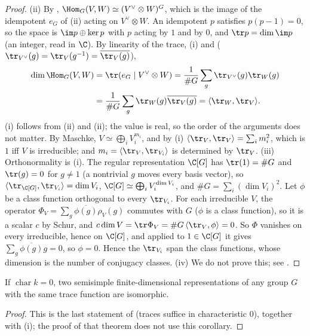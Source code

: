 \begin{proof}
(ii) By , $\Hom_G(V,W)\simeq(V^\vee\otimes W)^G$, which is the image of the idempotent $e_G$ of (ii) acting on
$V^\vee\otimes W$. An idempotent $p$ satisfies $p(p-1)=0$, so the space is $\im p\oplus\ker p$ with $p$ acting by $1$ and by $0$, and $\tr p=\dim\im p$
(an integer, read in $\C$). By linearity of the trace, (i) and 
($\tr_{V^\vee}(g)=\tr_V(g^{-1})=\overline{\tr_V(g)}$),
\begin{align*}
\dim\Hom_G(V,W)&=\tr(e_G\mid V^\vee\otimes W)=\frac1{\#G}\sum_g\tr_{V^\vee}(g)\tr_W(g)\\
&=\frac1{\#G}\sum_g\tr_W(g)\overline{\tr_V(g)}=\langle\tr_W,\tr_V\rangle.
\end{align*}
(i) follows from (ii) and (ii); the value is real, so the order of the arguments does not matter. By Maschke,
$V\simeq\bigoplus_iV_i^{m_i}$, and by (i) $\langle\tr_V,\tr_V\rangle=\sum_im_i^2$, which is $1$ iff $V$ is irreducible; and $m_i=\langle\tr_V,\tr_{V_i}\rangle$ is determined
by $\tr_V$.
(iii) Orthonormality is (i). The regular representation $\C[G]$ has $\tr(1)=\#G$ and $\tr(g)=0$ for $g\ne1$ (a nontrivial $g$ moves every
basis vector), so $\langle\tr_{\C[G]},\tr_{V_i}\rangle=\dim V_i$, $\C[G]\simeq\bigoplus_iV_i^{\dim V_i}$, and $\#G=\sum_i(\dim V_i)^2$. Let $\phi$ be a class function
orthogonal to every $\tr_{V_i}$. For each irreducible $V$, the operator $\Phi_V=\sum_g\overline{\phi(g)}\rho_V(g)$ commutes with $G$ ($\phi$ is a class
function), so it is a scalar $c$ by Schur, and $c\dim V=\tr\Phi_V=\#G\,\langle\tr_V,\phi\rangle=0$. So $\Phi$ vanishes on every irreducible, hence on $\C[G]$,
and applied to $1\in\C[G]$ it gives $\sum_g\overline{\phi(g)}g=0$, so $\phi=0$. Hence the $\tr_{V_i}$ span the class functions, whose dimension is the
number of conjugacy classes.
(iv) We do not prove this; see \cite[Section 6.5]{SerreLinearReps}.
\end{proof}

\begin{corollary}\label{cor:reps:traces-char0}
If $\operatorname{char}k=0$, two semisimple finite-dimensional representations of any group $G$ with the same trace function are
isomorphic.
\end{corollary}

\begin{proof}
This is the last statement of  (traces suffice in characteristic $0$), together with
(i); the proof of that theorem does not use this corollary.
\end{proof}

